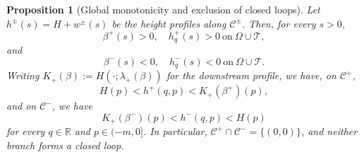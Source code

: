 \documentclass[12pt,letterpaper]{amsart}
\newtheorem{prop}[theorem]{Proposition}
\numberwithin{equation}{section}
\def\R{{\mathbb R}}
\begin{document}
	
\begin{prop}	[Global monotonicity and exclusion of closed loops]\label{prop:mono}
	{Let $h^\pm(s)=H+w^\pm(s)$ be the height profiles along $\mathcal C^\pm$. Then, for every $s>0$,}
	\begin{equation}\label{eq:nodalele}
		\beta^+(s)>0,\quad h_q^+(s)>0\mathrm{~on~}\Omega\cup\mathcal{T},
			\end{equation}
			and
			\begin{equation}\label{eq:nodaldep-global}
				\beta^-(s)<0,\quad h_q^-(s)<0\mathrm{~on~}\Omega\cup\mathcal{T}.
			\end{equation}
			{Writing $K_+(\beta):=H(\cdot;\lambda_+(\beta))$ for the downstream profile, we have, on $\mathcal C^+$,}
			\begin{equation*}
				H(p)< h^+(q,p)< {K_+(\beta^+)}(p),
			\end{equation*}
			and on $\mathcal{C}^-$, we have
			\begin{equation*}
				{K_+(\beta^-)}(p)<h^-(q,p)<H(p)
			\end{equation*}
			{for every $q\in\R$ and $p\in(-m,0]$. In particular, $\mathcal C^+\cap\mathcal C^-=\{(0,0)\}$, and neither branch forms a closed loop.}
\end{prop}	
\end{document}
